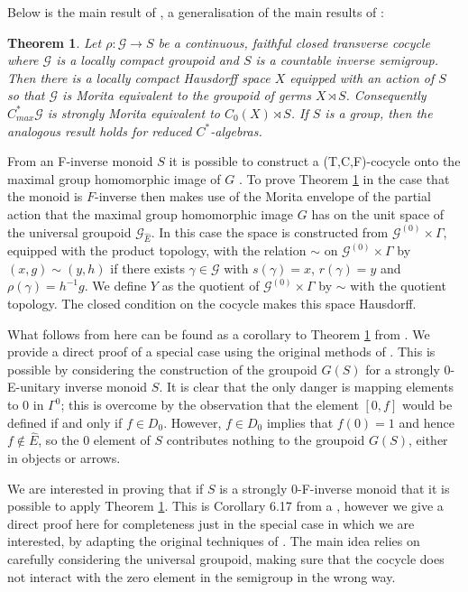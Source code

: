 \documentclass[11pt]{amsart}
\theoremstyle{plain}
\newtheorem{theorem}{Theorem}%
\theoremstyle{definition}%
\theoremstyle{remark}%
\newcommand{\G}{\mathcal{G}}
\newcommand{\E}{\widehat{E}}
\begin{document}
Below is the main result of \cite{Milan-Steinberg}, a generalisation of the main results of \cite{MR1900993}:

\begin{theorem}\label{Thm:IT2}
Let $\rho: \G \rightarrow S$ be a continuous, faithful closed transverse cocycle where $\G$ is a locally compact groupoid and $S$ is a countable inverse semigroup. Then there is a locally compact Hausdorff space $X$ equipped with an action of $S$ so that $\G$ is Morita equivalent to the groupoid of germs $X \rtimes S$. Consequently $C^{*}_{max}\G$ is strongly Morita equivalent to $C_{0}(X)\rtimes S$. If $S$ is a group, then the analogous result holds for reduced $C^{*}$-algebras.
\end{theorem}

From an F-inverse monoid $S$ it is possible to construct a (T,C,F)-cocycle onto the maximal group homomorphic image of $G$ \cite{MR1900993}. To prove Theorem \ref{Thm:IT2} in the case that the monoid is $F$-inverse then makes use of the Morita envelope of the partial action that the maximal group homomorphic image $G$ has on the unit space of the universal groupoid $\G_{\E}$. In this case the space is constructed from  $\G^{(0)}\times \Gamma$, equipped with the product topology, with the relation $\sim$ on $\G^{(0)}\times \Gamma$ by $(x,g)\sim (y,h)$ if there exists $\gamma \in \G$ with $s(\gamma)=x$, $r(\gamma)=y$ and $\rho(\gamma)=h^{-1}g$. We define $Y$ as the quotient of $\G^{(0)}\times \Gamma$ by $\sim$ with the quotient topology. The closed condition on the cocycle makes this space Hausdorff.

What follows from here can be found as a corollary to Theorem \ref{Thm:IT2} from \cite{Milan-Steinberg}. We provide a direct proof of a special case using the original methods of \cite{MR1900993}. This is possible by considering the construction of the groupoid $G(S)$ for a strongly 0-E-unitary inverse monoid $S$. It is clear that the only danger is mapping elements to $0$ in $\Gamma^{0}$; this is overcome by the observation that the element $[0,f]$ would be defined if and only if $f \in D_{0}$. However, $f \in D_{0}$ implies that $f(0)=1$ and hence $f \not\in \E$, so the $0$ element of $S$ contributes nothing to the groupoid $G(S)$, either in objects or arrows.

We are interested in proving that if $S$ is a strongly $0$-F-inverse monoid that it is possible to apply Theorem \ref{Thm:IT2}. This is Corollary 6.17 from a \cite{Milan-Steinberg}, however we give a direct proof here for completeness just in the special case in which we are interested, by adapting the original techniques of \cite{MR1900993}. The main idea relies on carefully considering the universal groupoid, making sure that the cocycle does not interact with the zero element in the semigroup in the wrong way.
\end{document}
